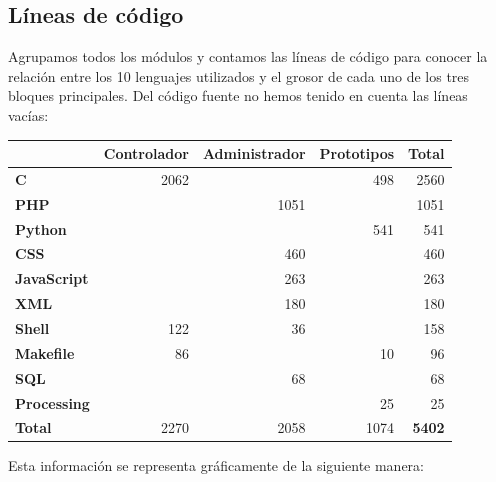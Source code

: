 \smallskip

\subsection{Líneas de código}

Agrupamos todos los módulos y contamos las líneas de código para conocer la relación entre los 10 lenguajes utilizados y el grosor de cada uno de los tres bloques principales. Del código fuente no hemos tenido en cuenta las líneas vacías:

\smallskip

\begin{center}
	\begin{tabular}{|l|r|r|r|r|}
		\hline & \textbf{Controlador} & \textbf{Administrador} & \textbf{Prototipos} & \textbf{Total} \\ 
		\hline \textbf{C} & 2062 & & 498 & 2560 \\
		\hline \textbf{PHP} & & 1051 & & 1051 \\
		\hline \textbf{Python} &  &  & 541 & 541 \\
		\hline \textbf{CSS} & & 460 & & 460 \\
		\hline \textbf{JavaScript} & & 263 & & 263 \\
		\hline \textbf{XML} & & 180 & & 180 \\
		\hline \textbf{Shell} & 122 & 36 & & 158 \\
		\hline \textbf{Makefile} & 86 &  & 10 & 96 \\
		\hline \textbf{SQL} & & 68 & & 68 \\
		\hline \textbf{Processing} & & & 25 & 25 \\
		\hline \textbf{Total} & 2270 & 2058 & 1074 & \textbf{5402} \\
		\hline 
	\end{tabular}
	\smallskip
\end{center}

\smallskip

Esta información se representa gráficamente de la siguiente manera:

\smallskip

